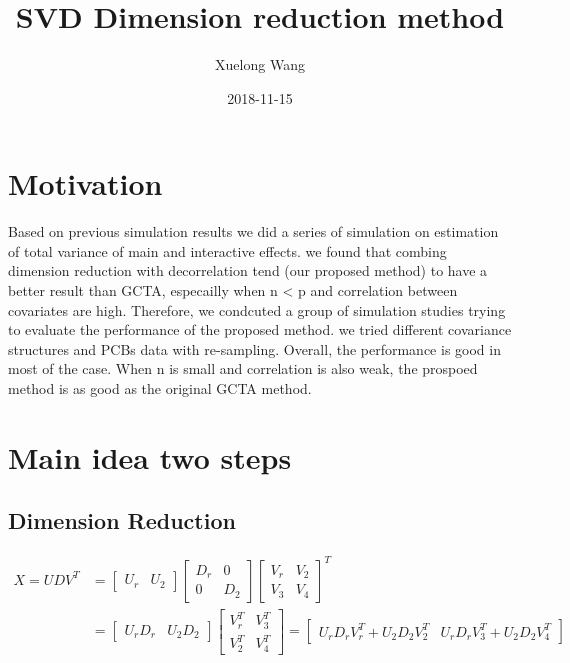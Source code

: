 \documentclass[]{article}
\title{SVD Dimension reduction method}
\author{Xuelong Wang}
\date{2018-11-15}
\begin{document}
\maketitle

{
\setcounter{tocdepth}{2}
\tableofcontents
}
\section{Motivation}\label{motivation}

Based on previous simulation results we did a series of simulation on
estimation of total variance of main and interactive effects. we found
that combing dimension reduction with decorrelation tend (our proposed
method) to have a better result than GCTA, especailly when n \textless{}
p and correlation between covariates are high. Therefore, we condcuted a
group of simulation studies trying to evaluate the performance of the
proposed method. we tried different covariance structures and PCBs data
with re-sampling. Overall, the performance is good in most of the case.
When n is small and correlation is also weak, the prospoed method is as
good as the original GCTA method.

\section{Main idea two steps}\label{main-idea-two-steps}

\subsection{Dimension Reduction}\label{dimension-reduction}

\begin{align*}
  X = U D V^T &= \begin{bmatrix}
                      U_r & U_2
                      \end{bmatrix}
                      \begin{bmatrix}
                      D_r & 0\\
                      0 & D_2
                      \end{bmatrix}
                      \begin{bmatrix}
                      V_r & V_2\\
                      V_3 & V_4
                      \end{bmatrix}^T \\ 
              &= 
                      \begin{bmatrix}
                      U_rD_r & U_2D_2
                      \end{bmatrix}
                      \begin{bmatrix}
                      V_r^T & V_3^T\\
                      V_2^T & V_4^T
                      \end{bmatrix}
                      =
                      \begin{bmatrix}
                      U_rD_rV_r^T + U_2D_2V_2^T & U_rD_rV_3^T + U_2D_2 V_4^T
                      \end{bmatrix}
\end{align*}
\end{document}
